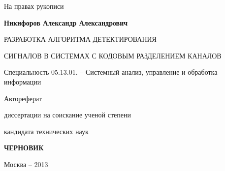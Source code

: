 \hfill На правах рукописи

\vspace{\baselineskip}
\vspace{\baselineskip}
\vspace{\baselineskip}
\vspace{\baselineskip}

\noindent\centerline{\bf{Никифоров Александр Александрович}}

\vspace{\baselineskip}
\vspace{\baselineskip}
\vspace{\baselineskip}
\vspace{\baselineskip}

\noindent\centerline{РАЗРАБОТКА АЛГОРИТМА ДЕТЕКТИРОВАНИЯ}
\noindent\centerline{СИГНАЛОВ В СИСТЕМАХ С КОДОВЫМ РАЗДЕЛЕНИЕМ КАНАЛОВ}

\vspace{\baselineskip}
\vspace{\baselineskip}
\vspace{\baselineskip}
\vspace{\baselineskip}

\noindent\centerline{Специальность 05.13.01. – Системный анализ, управление и обработка информации}

\vspace{\baselineskip}
\vspace{\baselineskip}
\vspace{\baselineskip}
\vspace{\baselineskip}

\noindent\centerline{Автореферат} 
\noindent\centerline{диссертации на соискание ученой степени}
\noindent\centerline{кандидата технических наук}


\vspace{\baselineskip}
\vspace{\baselineskip}
\vspace{\baselineskip}
\vspace{\baselineskip}
\noindent\centerline{\bf{ЧЕРНОВИК}}

\vfill
\noindent\centerline{Москва – 2013}

\newpage

\vspace{\baselineskip}
\vspace{\baselineskip}
\vspace{\baselineskip}
\vspace{\baselineskip}

